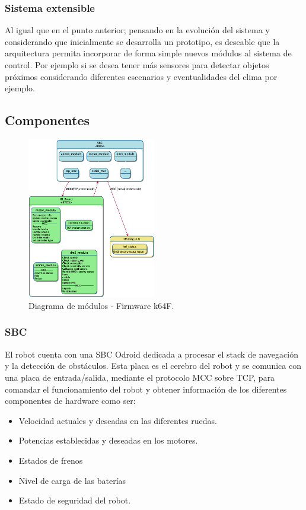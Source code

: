 \documentclass[withindex,glossary]{cam-thesis}
\begin{document}
\subsubsection{Sistema extensible}
Al igual que en el punto anterior; pensando en la evolución del sistema y considerando que inicialmente se desarrolla un prototipo, es deseable que la arquitectura permita incorporar de forma simple nuevos módulos al sistema de control. Por ejemplo si se desea tener más sensores para detectar objetos próximos considerando diferentes escenarios y eventualidades del clima por ejemplo.

\subsection{Componentes}

\begin{figure}[H]
\centering
\includegraphics[width=0.5\textwidth]{images/DM3_Modules}
\caption[Diagrama de componentes de módulos]{Diagrama de módulos - Firmware k64F.}
\end{figure}

\subsubsection{SBC}
El robot cuenta con una \gls{SBC} Odroid dedicada a procesar el stack de navegación y la detección de obstáculos. Esta placa es el cerebro del robot y se comunica con una placa de entrada/salida, mediante el protocolo MCC sobre TCP, para comandar el funcionamiento del robot y obtener información de los diferentes componentes de hardware como ser: 
\begin{itemize}
	\item Velocidad actuales y deseadas en las diferentes ruedas.
	\item Potencias establecidas y deseadas en los motores.
	\item Estados de frenos
	\item Nivel de carga de las baterías
	\item Estado de seguridad del robot.
\end{itemize}
\end{document}
